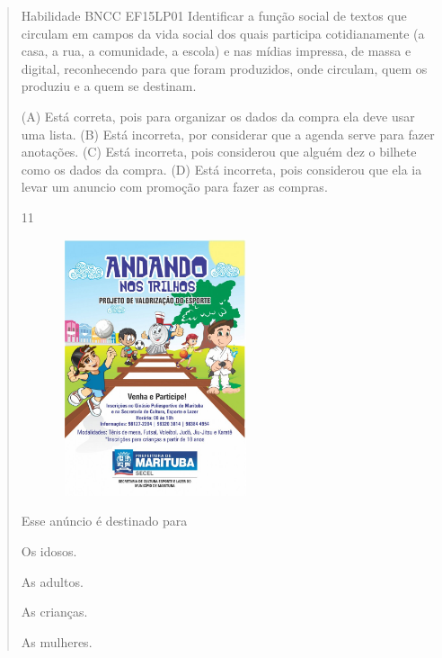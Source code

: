 \begin{verse}
{Habilidade BNCC EF15LP01 Identificar a função social de textos que
circulam em campos da vida social dos quais participa cotidianamente (a
casa, a rua, a comunidade, a escola) e nas mídias impressa, de massa e
digital, reconhecendo para que foram produzidos, onde circulam, quem os
produziu e a quem se destinam.}

(A) Está correta, pois para organizar os dados da compra ela deve usar uma lista.
(B) Está incorreta, por considerar que a agenda serve para fazer anotações.
(C) Está incorreta, pois considerou que alguém dez o bilhete como os dados da compra.
(D) Está incorreta, pois considerou que ela ia levar um anuncio com promoção para fazer as compras.

\num{11}

\includegraphics[width=3.11515in,height=2.97237in]{media/image170.jpeg}


Esse anúncio é destinado para

\begin{minipage}{.5\textwidth}
\begin{escolha}
\item Os idosos.

\item As adultos.

\item As crianças.

\item As mulheres.
\end{escolha}
\end{minipage}


\end{verse}
